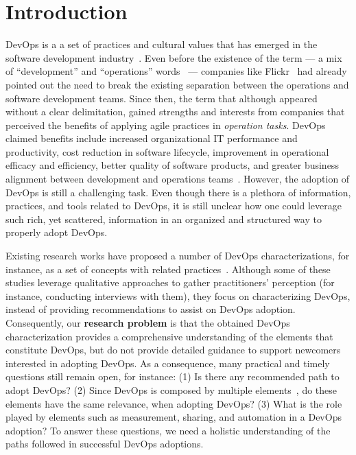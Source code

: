 \section{Introduction} \label{sec:introduction}

DevOps is a a set of practices and cultural values that has emerged in the
software development industry~\cite{devops_a_definition_xp_15,dimensions_of_devops_xp_15,extending_dimensions_icsea_16,characterizing_devops_sbes_2016}. Even before
the existence of the term --- a mix of ``development'' and ``operations''
words~\cite{httermann2012devops} --- companies like Flickr~\cite{flickr}
had already pointed out the need to break the existing separation between
the operations and software development teams. Since then, the term
that although appeared without a clear delimitation, gained strengths and interests
from companies that perceived the benefits of applying agile practices in
\emph{operation tasks}.
DevOps claimed benefits include increased organizational IT
performance and productivity, cost reduction in software lifecycle, improvement
in operational efficacy and efficiency, better quality of software products, and
greater business alignment between development and operations
teams~\cite{characterizing_devops_sbes_2016,state_of_devops,DevOps_Adoption_Benefits_and_Challenges}.
However, the adoption of DevOps is still a challenging task. Even though there is a
plethora of information, practices, and tools related to DevOps, it is still unclear
how one could leverage such rich, yet scattered, information in an organized and
structured way to properly adopt DevOps.

Existing research works have proposed a
number of DevOps characterizations, for instance, as a set of concepts with
related
practices~\cite{devops_a_definition_xp_15,dimensions_of_devops_xp_15,extending_dimensions_icsea_16,characterizing_devops_sbes_2016,cooperation_dev_ops_esem_2014,qualitative_devops_journalsw_17}. Although some
of these studies leverage qualitative approaches to gather practitioners' perception (for instance,
conducting interviews with them), they focus on characterizing DevOps,
instead of providing recommendations to assist on DevOps adoption. Consequently,
our {\bf research problem} is that the obtained DevOps characterization provides a
comprehensive understanding of the elements that constitute DevOps, but do not
provide detailed guidance to support newcomers interested in adopting DevOps.
As a consequence, many practical and timely questions still remain open, for
instance: (1) Is there any recommended path to adopt DevOps? (2) Since
DevOps is composed by multiple elements~\cite{dimensions_of_devops_xp_15}, do
these elements have the same relevance, when adopting DevOps?
(3) What is the role played by elements such as measurement, sharing, and automation
in a DevOps adoption? To answer these questions, we need a holistic
understanding of the paths followed in successful DevOps adoptions.

